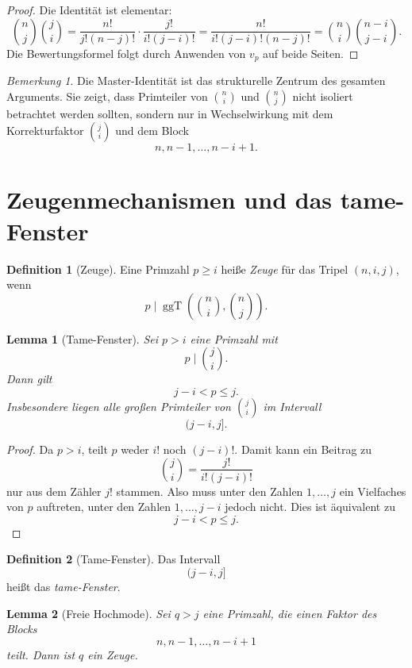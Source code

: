 \documentclass[12pt,a4paper]{article}
\theoremstyle{plain}
\newtheorem{lemma}{Lemma}
\theoremstyle{definition}
\newtheorem{definition}{Definition}
\theoremstyle{remark}
\newtheorem{bemerkung}{Bemerkung}
\newcommand{\vp}{v_p}
\newcommand{\ggT}{\operatorname{ggT}}
\begin{document}
	\begin{proof}
		Die Identität ist elementar:
		\[
		\binom{n}{j}\binom{j}{i}
		=
		\frac{n!}{j!(n-j)!}\cdot \frac{j!}{i!(j-i)!}
		=
		\frac{n!}{i!(j-i)!(n-j)!}
		=
		\binom{n}{i}\binom{n-i}{j-i}.
		\]
		Die Bewertungsformel folgt durch Anwenden von $\vp$ auf beide Seiten.
	\end{proof}
	
	\begin{bemerkung}
		Die Master-Identität ist das strukturelle Zentrum des gesamten Arguments. 
		Sie zeigt, dass Primteiler von $\binom{n}{i}$ und $\binom{n}{j}$ nicht isoliert betrachtet werden sollten, sondern nur in Wechselwirkung mit dem Korrekturfaktor $\binom{j}{i}$ und dem Block
		\[
		n,n-1,\dots,n-i+1.
		\]
	\end{bemerkung}
	
	\section{Zeugenmechanismen und das tame-Fenster}
	
	\begin{definition}[Zeuge]
		Eine Primzahl $p \ge i$ heiße \emph{Zeuge} für das Tripel $(n,i,j)$, wenn
		\[
		p \mid \ggT\!\left(\binom{n}{i},\binom{n}{j}\right).
		\]
	\end{definition}
	
	\begin{lemma}[Tame-Fenster]\label{lem:tame}
		Sei $p>i$ eine Primzahl mit
		\[
		p \mid \binom{j}{i}.
		\]
		Dann gilt
		\[
		j-i < p \le j.
		\]
		Insbesondere liegen alle großen Primteiler von $\binom{j}{i}$ im Intervall
		\[
		(j-i,j].
		\]
	\end{lemma}
	
	\begin{proof}
		Da $p>i$, teilt $p$ weder $i!$ noch $(j-i)!$. 
		Damit kann ein Beitrag zu
		\[
		\binom{j}{i}=\frac{j!}{i!(j-i)!}
		\]
		nur aus dem Zähler $j!$ stammen. 
		Also muss unter den Zahlen $1,\dots,j$ ein Vielfaches von $p$ auftreten, unter den Zahlen $1,\dots,j-i$ jedoch nicht. 
		Dies ist äquivalent zu
		\[
		j-i < p \le j.
		\]
	\end{proof}
	
	\begin{definition}[Tame-Fenster]
		Das Intervall
		\[
		(j-i,j]
		\]
		heißt das \emph{tame-Fenster}.
	\end{definition}
	
	\begin{lemma}[Freie Hochmode]\label{lem:highmode}
		Sei $q>j$ eine Primzahl, die einen Faktor des Blocks
		\[
		n,n-1,\dots,n-i+1
		\]
		teilt. Dann ist $q$ ein Zeuge.
	\end{lemma}
	
\end{document}
